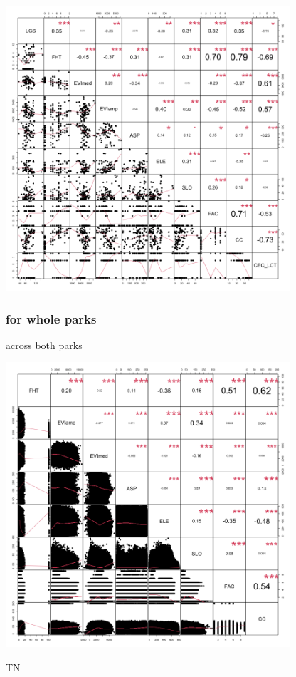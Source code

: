 \documentclass[
  letterpaper,
  DIV=11,
  numbers=noendperiod]{scrartcl}
\begin{document}
\includegraphics[width=4.16667in,height=\textheight]{correlation plots/chart_subplot_GM.png}

\hypertarget{for-whole-parks}{%
\subsubsection{for whole parks}\label{for-whole-parks}}

across both parks

\includegraphics[width=4.16667in,height=\textheight]{correlation plots/chart_raster_NL.png}

TN
\end{document}
